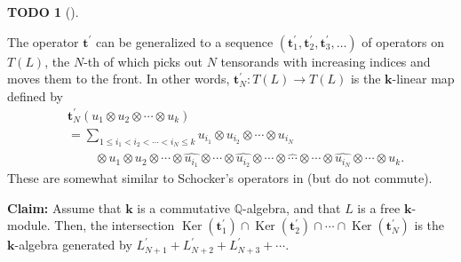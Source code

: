 \documentclass[numbers=enddot,12pt,final,onecolumn,notitlepage]{scrartcl}%
\theoremstyle{definition}
\newtheorem{quest}[theo]{TODO}
\newenvironment{todo}[1][]
{\begin{quest}[#1]\begin{leftbar}}
{\end{leftbar}\end{quest}}
\let\sumnonlimits\sum
\renewcommand{\sum}{\sumnonlimits\limits}
\begin{document}
\begin{todo}
The operator $\mathbf{t}^{\prime}$ can be generalized to a sequence $\left(
\mathbf{t}_{1}^{\prime},\mathbf{t}_{2}^{\prime},\mathbf{t}_{3}^{\prime}%
,\ldots\right)  $ of operators on $T\left(  L\right)  $, the $N$-th of which
picks out $N$ tensorands with increasing indices and moves them to the front.
In other words, $\mathbf{t}_{N}^{\prime}:T\left(  L\right)  \rightarrow
T\left(  L\right)  $ is the $\mathbf{k}$-linear map defined by%
\begin{align*}
&  \mathbf{t}_{N}^{\prime}\left(  u_{1}\otimes u_{2}\otimes\cdots\otimes
u_{k}\right) \\
&  =\sum_{1\leq i_{1}<i_{2}<\cdots<i_{N}\leq k}u_{i_{1}}\otimes u_{i_{2}%
}\otimes\cdots\otimes u_{i_{N}}\\
&  \ \ \ \ \ \ \ \ \ \ \otimes u_{1}\otimes u_{2}\otimes\cdots\otimes
\widehat{u_{i_{1}}}\otimes\cdots\otimes\widehat{u_{i_{2}}}\otimes\cdots
\otimes\widehat{\cdots}\otimes\cdots\otimes\widehat{u_{i_{N}}}\otimes
\cdots\otimes u_{k}.
\end{align*}
These are somewhat similar to Schocker's operators in \cite{schocker} (but do
not commute).

\textbf{Claim:} Assume that $\mathbf{k}$ is a commutative $\mathbb{Q}%
$-algebra, and that $L$ is a free $\mathbf{k}$-module. Then, the intersection
$\operatorname*{Ker}\left(  \mathbf{t}_{1}^{\prime}\right)  \cap
\operatorname*{Ker}\left(  \mathbf{t}_{2}^{\prime}\right)  \cap\cdots
\cap\operatorname*{Ker}\left(  \mathbf{t}_{N}^{\prime}\right)  $ is the
$\mathbf{k}$-algebra generated by $L_{N+1}^{\prime}+L_{N+2}^{\prime}%
+L_{N+3}^{\prime}+\cdots$.


\end{todo}
\end{document}
